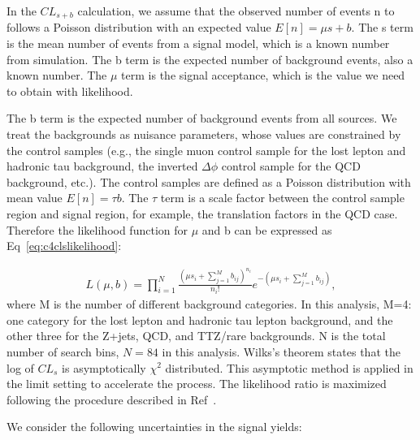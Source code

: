 In the $CL_{s+b}$ calculation, we assume that the observed number of events n to follows a Poisson distribution with an expected value $E[n]=\mu s+b$. The s term is the mean number of events from a signal model, which is a known number from simulation. The b term is the expected number of background events, also a known number. The $\mu$ term is the signal acceptance, which is the value we need to obtain with likelihood. 

The b term is the expected number of background events from all sources. We treat the backgrounds as nuisance parameters, whose values are constrained by the control samples (e.g., the single muon control sample for the lost lepton and hadronic tau background, the inverted $\Delta \phi$ control sample for the QCD background, etc.). The control samples are defined as a Poisson distribution with mean value $E[n]=\tau b$. The $\tau$ term is a scale factor between the control sample region and signal region, for example, the translation factors in the QCD case. Therefore the likelihood function for $\mu$ and b can be expressed as Eq~\ref{eq:c4clslikelihood}:

\begin{equation}
 \begin{aligned}
	 L(\mu,b)= \prod_{i=1}^{N} \frac{(\mu s_{i}+\sum_{j=1}^{M}b_{ij})^{n_{i}}}{n_{i}!}e^{-(\mu s_{i}+\sum_{j=1}^{M}b_{ij})},
 \end{aligned}
 \label{eq:c4clslikelihood}
\end{equation}
where M is the number of different background categories. In this analysis, M=4: one category for the lost lepton and hadronic tau lepton background, and the other three for the Z+jets, QCD, and TTZ/rare backgrounds. N is the total number of search bins, $N=84$ in this analysis. Wilks's theorem\cite{Wilks:1938dza} states that the log of $CL_{s}$ is asymptotically $\chi^{2}$ distributed. This asymptotic method is applied in the limit setting to accelerate the process. The likelihood ratio is maximized following the procedure described in Ref~\cite{Cowan:2010js}.

We consider the following uncertainties in the signal yields: 

